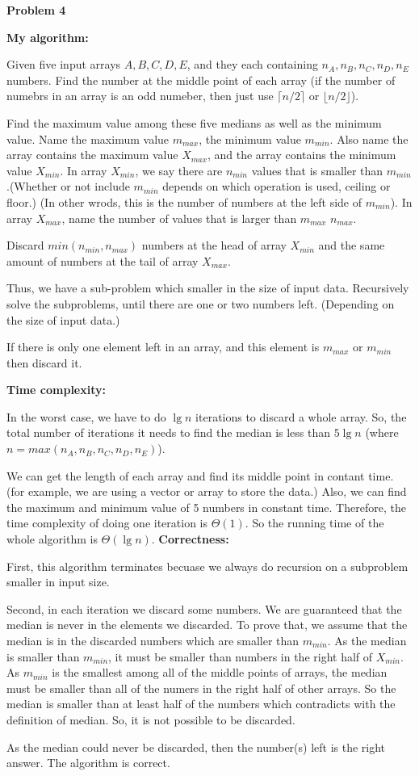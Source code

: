 \documentclass[12pt,letterpaper]{article}
\def\pp{\par\noindent}
\newcommand{\problem}[1]{ \bigskip \pp \textbf{Problem #1}\par}
\begin{document}
\problem{4}
\textbf{My algorithm:}\par
Given five input arrays $A, B, C, D, E$, and they each containing $n_A, n_B, n_C, n_D, n_E$ numbers. Find the number at the middle point of each array (if the number of numebrs in an array is an odd numeber, then just use $\lceil n/2\rceil$ or $\lfloor n/2\rfloor$).\par
Find the maximum value among these five medians as well as the minimum value. Name the maximum value $m_{max}$, the minimum value $m_{min}$. Also name the array contains the maximum value $X_{max}$, and the array contains the minimum value $X_{min}$. In array $X_{min}$, we say there are $n_{min}$ values that is smaller than $m_{min}$.(Whether or not include $m_{min}$ depends on which operation is used, ceiling or floor.) (In other wrods, this is the number of numbers at the left side of $m_{min}$). In array $X_{max}$, name the number of values that is larger than $m_{max}$ $n_{max}$.\par
Discard $min(n_{min}, n_{max})$ numbers at the head of array $X_{min}$ and the same amount of numbers at the tail of array $X_{max}$.\par
Thus, we have a sub-problem which smaller in the size of input data. Recursively solve the subproblems, until there are one or two numbers left. (Depending on the size of input data.)\par
If there is only one element left in an array, and this element is $m_{max}$ or $m_{min}$ then discard it.\par
\textbf{Time complexity:}\par
In the worst case, we have to do $\lg n$ iterations to discard a whole array. So, the total number of iterations it needs to find the median is less than $5\lg n$ (where $n=max(n_A, n_B, n_C, n_D, n_E)$).\par
We can get the length of each array and find its middle point in contant time. (for example, we are using a vector or array to store the data.) Also, we can find the maximum and minimum value of 5 numbers in constant time. Therefore, the time complexity of doing one iteration is $\Theta(1)$. So the running time of the whole algorithm is $\Theta(\lg n)$.
\textbf{Correctness:}\par
First, this algorithm terminates becuase we always do recursion on a subproblem smaller in input size.\par
Second, in each iteration we discard some numbers. We are guaranteed that the median is never in the elements we discarded. To prove that, we assume that the median is in the discarded numbers which are smaller than $m_{min}$. As the median is smaller than $m_{min}$, it must be smaller than numbers in the right half of $X_{min}$. As $m_{min}$ is the smallest among all of the middle points of arrays, the median must be smaller than all of the numers in the right half of other arrays. So the median is smaller than at least half of the numbers which contradicts with the definition of median. So, it is not possible to be discarded.\par
As the median could never be discarded, then the number(s) left is the right answer. The algorithm is correct.\par
\end{document}
